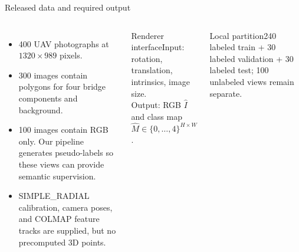 \documentclass[aspectratio=169,10pt]{beamer}
\begin{document}
\begin{frame}{Released data and required output}
\begin{columns}[T,onlytextwidth]
\begin{itemize}\tightitems
\item 400 UAV photographs at $1320\times989$ pixels.
\item 300 images contain polygons for four bridge components and background.
\item 100 images contain RGB only. Our pipeline generates pseudo-labels so these views can provide semantic supervision.
\item SIMPLE\_RADIAL calibration, camera poses, and COLMAP feature tracks are supplied, but no precomputed 3D points.
\end{itemize}
\begin{block}{Renderer interface}Input: rotation, translation, intrinsics, image size.\\[.3em]Output: RGB $\hat I$ and class map $\hat M\in\{0,\ldots,4\}^{H\times W}$.\end{block}
\begin{block}{Local partition}240 labeled train + 30 labeled validation + 30 labeled test; 100 unlabeled views remain separate.\end{block}
\end{columns}
\end{frame}
\end{document}
